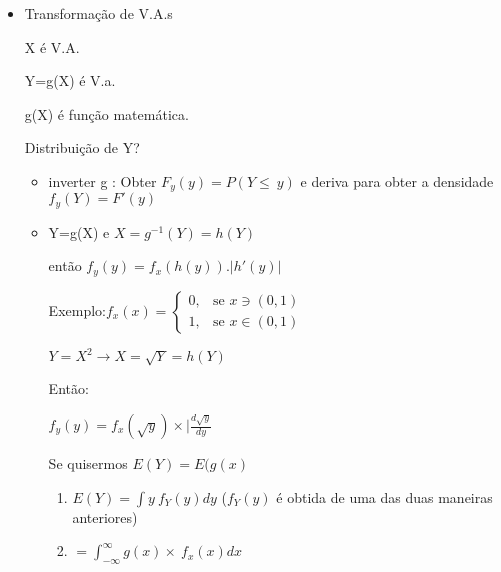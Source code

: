 \documentclass[11pt,a4paper]{book}
\begin{document}
\begin{itemize}
		\begin{itemize}
			\item Transformação de V.A.s
			
			X é V.A.
			
			Y=g(X) é V.a.
			
			g(X) é função matemática.
			
			Distribuição de Y? 
			\begin{itemize}
				\item inverter g : Obter $F_y(y)=P(Y \leq~y)$ e deriva para obter a densidade $f_y(Y)=F'(y)$
				\item Y=g(X) e $X=g^{-1}(Y)=h(Y)$
				
				então $f_y(y)=f_x(h(y)).|h'(y)|$
				
				Exemplo:$ f_x(x) = \left.
				\begin{cases}
					0, & \mbox{se } x \ni (0,1)\\
					1, & \mbox{se } x \in (0,1)
				\end{cases}
				\right.
				$
				
				$Y=X^2\rightarrow X=\sqrt{Y}=h(Y)$
				
				Então:
				
				$f_y(y)=f_x(\sqrt{y})\times |\frac{d\sqrt{y}}{dy}$
				
				Se quisermos $E(Y) = E(g(x)$
				\begin{enumerate}
					\item $E(Y) = \int y~f_Y(y)dy$ ($f_Y(y)$ é obtida de uma das duas maneiras anteriores)
					\item $=\int_{-\infty}^{\infty} g(x)\times~f_x(x)dx$
				\end{enumerate}
			\end{itemize} 
			
		\end{itemize}
	\end{itemize}
\end{document}
